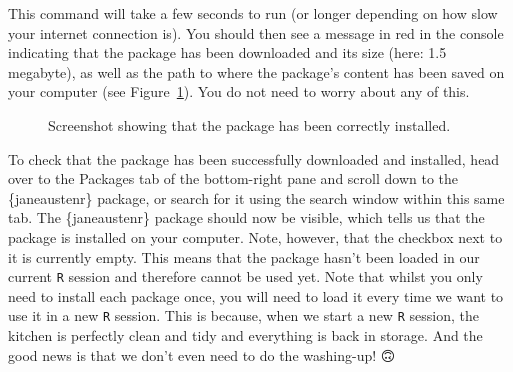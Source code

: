\documentclass[
  letterpaper,
  DIV=11,
  numbers=noendperiod,
  oneside]{scrreprt}
\begin{document}
This command will take a few seconds to run (or longer depending on how
slow your internet connection is). You should then see a message in red
in the console indicating that the package has been downloaded and its
size (here: 1.5 megabyte), as well as the path to where the package's
content has been saved on your computer (see
Figure~\ref{fig-PckInstalled}). You do not need to worry about any of
this.

\begin{figure}


\caption{\label{fig-PckInstalled}Screenshot showing that the package has
been correctly installed.}

\end{figure}%

To check that the package has been successfully downloaded and
installed, head over to the Packages tab of the bottom-right pane and
scroll down to the \{janeaustenr\} package, or search for it using the
search window within this same tab. The \{janeaustenr\} package should
now be visible, which tells us that the package is installed on your
computer. Note, however, that the checkbox next to it is currently
empty. This means that the package hasn't been loaded in our current
\texttt{R} session and therefore cannot be used yet. Note that whilst
you only need to install each package once, you will need to load it
every time we want to use it in a new \texttt{R} session. This is
because, when we start a new \texttt{R} session, the kitchen is
perfectly clean and tidy and everything is back in storage. And the good
news is that we don't even need to do the washing-up! 🙃
\end{document}

